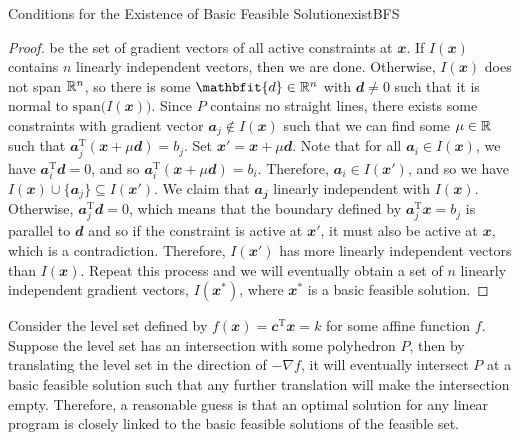 \documentclass[math, code]{amznotes}
\theoremstyle{remark}
\begin{document}
\begin{thmbox}{Conditions for the Existence of Basic Feasible Solution}{existBFS}
\begin{proof}
        be the set of gradient vectors of all active constraints at $\mathbfit{x}$. If $I(\mathbfit{x})$ contains $n$ linearly independent vectors, then we are done. Otherwise, $I(\mathbfit{x})$ does not span $\mathbb{R}^n$, so there is some $\mathbfit{d} \in \R^n$ with $\mathbfit{d} \neq 0$ such that it is normal to $\mathrm{span}\bigl(I(\mathbfit{x})\bigr)$. Since $P$ contains no straight lines, there exists some constraints with gradient vector $\mathbfit{a}_j \notin I(\mathbfit{x})$ such that we can find some $\mu \in \mathbb{R}$ such that $\mathbfit{a}_j^{\mathrm{T}}(\mathbfit{x} + \mu\mathbfit{d}) = b_j$. Set $\mathbfit{x}' = \mathbfit{x} + \mu\mathbfit{d}$. Note that for all $\mathbfit{a}_i \in I(\mathbfit{x})$, we have $\mathbfit{a}_i^{\mathrm{T}}\mathbfit{d} = 0$, and so $\mathbfit{a}_i^{\mathrm{T}}(\mathbfit{x} + \mu\mathbfit{d}) = b_i$. Therefore, $\mathbfit{a}_i \in I(\mathbfit{x}')$, and so we have $I(\mathbfit{x}) \cup \{\mathbfit{a}_j\} \subseteq I(\mathbfit{x}')$. We claim that $\mathbfit{a_j}$ linearly independent with $I(\mathbfit{x})$. Otherwise, $\mathbfit{a}_j^{\mathrm{T}}\mathbfit{d} = 0$, which means that the boundary defined by $\mathbfit{a}_j^{\mathrm{T}}\mathbfit{x} = b_j$ is parallel to $\mathbfit{d}$ and so if the constraint is active at $\mathbfit{x}'$, it must also be active at $\mathbfit{x}$, which is a contradiction. Therefore, $I(\mathbfit{x}')$ has more linearly independent vectors than $I(\mathbfit{x})$. Repeat this process and we will eventually obtain a set of $n$ linearly independent gradient vectors, $I(\mathbfit{x}^*)$, where $\mathbfit{x}^*$ is a basic feasible solution.
    \end{proof}
\end{thmbox}
Consider the level set defined by $f(\mathbfit{x}) = \mathbfit{c}^{\mathrm{T}}\mathbfit{x} = k$ for some affine function $f$. Suppose the level set has an intersection with some polyhedron $P$, then by translating the level set in the direction of $-\nabla f$, it will eventually intersect $P$ at a basic feasible solution such that any further translation will make the intersection empty. Therefore, a reasonable guess is that an optimal solution for any linear program is closely linked to the basic feasible solutions of the feasible set.
\end{document}
